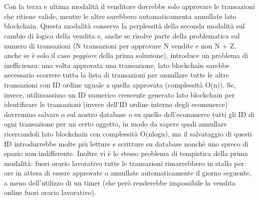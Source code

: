 \documentclass[a4paper, 12pt]{article}
\begin{document}
\begin{itemize}
\\\\Con la terza e ultima modalità il venditore dovrebbe solo approvare le transazioni che ritiene valide, mentre le altre sarebbero automaticamenta annullate lato blockchain. Questa modalità conserva la perplessità della seconda modalità sul cambio di logica della vendita e, anche se risolve parte della problematica sul numero di transazioni (N transazioni per approvare N vendite e non N + Z, anche se è solo il caso \textit{peggiore} della prima soluzione), introduce un problema di inefficienza: una volta approvata una transazione, lato blockchain sarebbe necessario scorrere tutta la lista di transazioni per annullare tutte le altre transazioni con ID ordine uguale a quella approvata (complessità O(n)). Se, invece, utilizzassimo un ID numerico crescente generato lato blockchain per identificare le transazioni (invece dell'ID ordine interno degli ecommerce) dovremmo salvare o sul nostro database o su quello dell'ecommerce tutti gli ID di ogni transazione per un certo oggetto, in modo da sapere quali annullare ricercandoli lato blockchain con complessità O(nlogn), ma il salvataggio di questi ID introdurrebbe molte più letture e scritture su database nonchè uno spreco di spazio non indifferente.
Inoltre vi è lo stesso problema di tempistica della prima modalità: fuori orario lavorativo tutte le transazioni rimarrebbero in stallo per ore in attesa di essere approvate o annullate automaticamente il giorno seguente, a meno dell'utilizzo di un timer (che però renderebbe impossibile la vendita online fuori orario lavorativo).

\end{itemize}

\newpage
\end{document}
